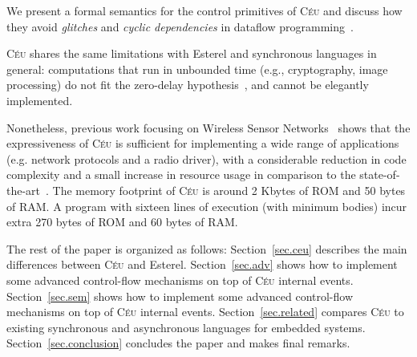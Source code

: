 \documentclass{acm_proc_article-sp}
\newcommand{\CEU}{\textsc{C\'{e}u}\xspace}
\newcommand{\1}{\;}
\newcommand{\2}{\;\;}
\newcommand{\3}{\;\;\;}
\newcommand{\5}{\;\;\;\;\;}
\begin{document}
We present a formal semantics for the control primitives of \CEU and discuss 
how they avoid \emph{glitches} and \emph{cyclic dependencies} in dataflow 
programming~\cite{frp.survey}.


\CEU shares the same limitations with Esterel and synchronous languages in 
general:
computations that run in unbounded time (e.g., cryptography, image processing) 
do not fit the zero-delay hypothesis~\cite{rp.hypothesis}, and cannot be 
elegantly implemented.

Nonetheless, previous work focusing on Wireless Sensor 
Networks~\cite{ceu.sensys} shows that the expressiveness of \CEU is sufficient 
for implementing a wide range of applications (e.g. network protocols and a 
radio driver), with a considerable reduction in code complexity and a small 
increase in resource usage in comparison to the 
state-of-the-art~\cite{wsn.nesc}.
%
The memory footprint of \CEU is around 2 Kbytes of ROM and 50 bytes of RAM.
A program with sixteen lines of execution (with minimum bodies) incur extra 270 
bytes of ROM and 60 bytes of RAM.

The rest of the paper is organized as follows:
Section~\ref{sec.ceu} describes the main differences between \CEU and 
Esterel.
Section~\ref{sec.adv} shows how to implement some advanced control-flow 
mechanisms on top of \CEU internal events.
Section~\ref{sec.sem} shows how to implement some advanced control-flow 
mechanisms on top of \CEU internal events.
Section~\ref{sec.related} compares \CEU to existing synchronous and 
asynchronous languages for embedded systems.
Section~\ref{sec.conclusion} concludes the paper and makes final remarks.
\end{document}
